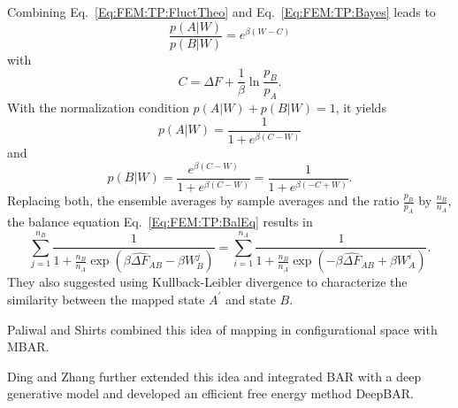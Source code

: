 Combining Eq.~\ref{Eq:FEM:TP:FluctTheo} and Eq.~\ref{Eq:FEM:TP:Bayes} leads to
\begin{equation}
	\frac{p(A|W)}{p(B|W)}=e^{\beta(W-C)}
\end{equation}
with
\begin{equation}
	C=\Delta F+\frac{1}{\beta}\ln{\frac{p_B}{p_A}}.
\end{equation}
With the normalization condition $p(A|W)+p(B|W)=1$, it yields
\begin{equation}
	p(A|W)=\frac{1}{1+e^{\beta(C-W)}}
\end{equation}
and
\begin{equation}
	p(B|W)=\frac{e^{\beta(C-W)}}{1+e^{\beta(C-W)}}=\frac{1}{1+e^{\beta(-C+W)}}.
\end{equation}
Replacing both, the ensemble averages by sample averages and the ratio $\frac{p_B}{p_A}$ by $\frac{n_B}{n_A}$, the balance equation Eq.~\ref{Eq:FEM:TP:BalEq} results in
\begin{equation}
	\sum_{j=1}^{n_B}\frac{1}{1+\frac{n_B}{n_A}\exp{\left(\beta\widehat{\Delta F}_{AB}-\beta W^j_B\right)}}=	\sum_{i=1}^{n_A}\frac{1}{1+\frac{n_B}{n_A}\exp{\left(-\beta\widehat{\Delta F}_{AB}+\beta W^i_A\right)}}.
\end{equation}
They also suggested using Kullback-Leibler divergence to characterize the similarity between the mapped state $A^\prime$ and state $B$.

Paliwal and Shirts combined this idea of mapping in configurational space with MBAR.\cite{PaliwalJCP2013}

Ding and Zhang further extended this idea and integrated BAR with a deep generative model and developed an efficient free energy method DeepBAR.\cite{DingJPCL2021}